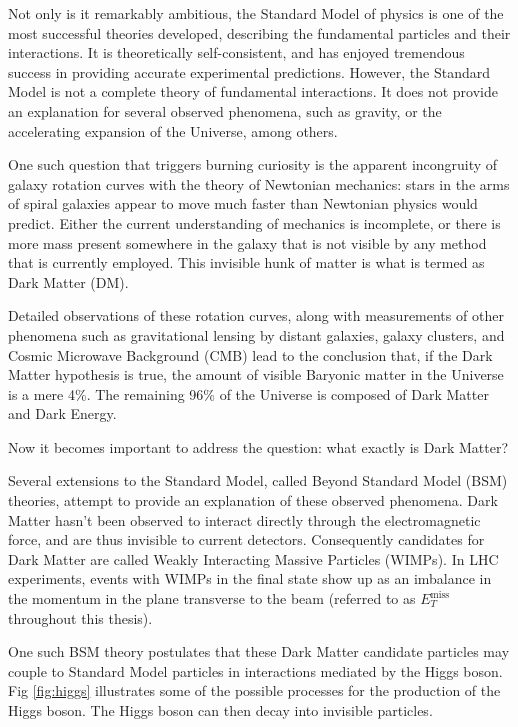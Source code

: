 \documentclass[12pt,a4paper,openright,twoside]{report}
\newcommand{\met}{$E_T^{\mathrm{miss}}$ }
\begin{document}
Not only is it remarkably ambitious, the Standard Model of physics is one of the most successful theories developed, describing the fundamental particles and their interactions\cite{griff}. It is theoretically self-consistent, and has enjoyed tremendous success in providing accurate experimental predictions. However, the Standard Model is not a complete theory of fundamental interactions. It does not provide an explanation for several observed phenomena, such as gravity, or the accelerating expansion of the Universe, among others.

One such question that triggers burning curiosity is the apparent incongruity of galaxy rotation curves with the theory of Newtonian mechanics: stars in the arms of spiral galaxies appear to move much faster than Newtonian physics would predict. Either the current understanding of mechanics is incomplete, or there is more mass present somewhere in the galaxy that is not visible by any method that is currently employed. This invisible hunk of matter is what is termed as Dark Matter (DM).

Detailed observations of these rotation curves, along with measurements of other phenomena such as gravitational lensing by distant galaxies, galaxy clusters, and Cosmic Microwave Background (CMB) lead to the conclusion that, if the Dark Matter hypothesis is true, the amount of visible Baryonic matter in the Universe is a mere 4\%. The remaining 96\% of the Universe is composed of Dark Matter and Dark Energy.

Now it becomes important to address the question: what exactly is Dark Matter? 

Several extensions to the Standard Model, called Beyond Standard Model (BSM) theories, attempt to provide an explanation of these observed phenomena. Dark Matter hasn't been observed to interact directly through the electromagnetic force, and are thus invisible to current detectors. Consequently candidates for Dark Matter are called Weakly Interacting Massive Particles (WIMPs). In LHC experiments, events with WIMPs in the final state show up as an imbalance in the momentum in the plane transverse to the beam (referred to as \met throughout this thesis).

One such BSM theory postulates that these Dark Matter candidate particles may couple to Standard Model particles in interactions mediated by the Higgs boson. Fig \ref{fig:higgs} illustrates some of the possible processes for the production of the Higgs boson. The Higgs boson can then decay into invisible particles.
\end{document}
